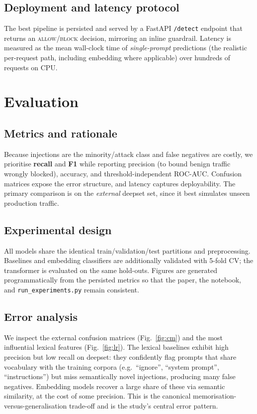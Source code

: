 \documentclass[conference]{IEEEtran}
\begin{document}
\subsection{Deployment and latency protocol}
The best pipeline is persisted and served by a FastAPI \texttt{/detect}
endpoint that returns an \textsc{allow}/\textsc{block} decision, mirroring an
inline guardrail. Latency is measured as the mean wall-clock time of
\emph{single-prompt} predictions (the realistic per-request path, including
embedding where applicable) over hundreds of requests on CPU.

\section{Evaluation}\label{sec:eval}
\subsection{Metrics and rationale}
Because injections are the minority/attack class and false negatives are costly,
we prioritise \textbf{recall} and \textbf{F1} while reporting precision (to
bound benign traffic wrongly blocked), accuracy, and threshold-independent
ROC-AUC. Confusion matrices expose the error structure, and latency captures
deployability. The primary comparison is on the \emph{external} deepset set,
since it best simulates unseen production traffic.

\subsection{Experimental design}
All models share the identical train/validation/test partitions and
preprocessing. Baselines and embedding classifiers are additionally validated
with 5-fold CV; the transformer is evaluated on the same hold-outs. Figures are
generated programmatically from the persisted metrics so that the paper, the
notebook, and \texttt{run\_experiments.py} remain consistent.

\subsection{Error analysis}
We inspect the external confusion matrices (Fig.~\ref{fig:cm}) and the most
influential lexical features (Fig.~\ref{fig:lr}). The lexical baselines exhibit
high precision but low recall on deepset: they confidently flag prompts that
share vocabulary with the training corpora (e.g.\ ``ignore'', ``system
prompt'', ``instructions'') but miss semantically novel injections, producing
many false negatives. Embedding models recover a large share of these via
semantic similarity, at the cost of some precision. This is the canonical
memorisation-versus-generalisation trade-off and is the study's central error
pattern.
\end{document}
